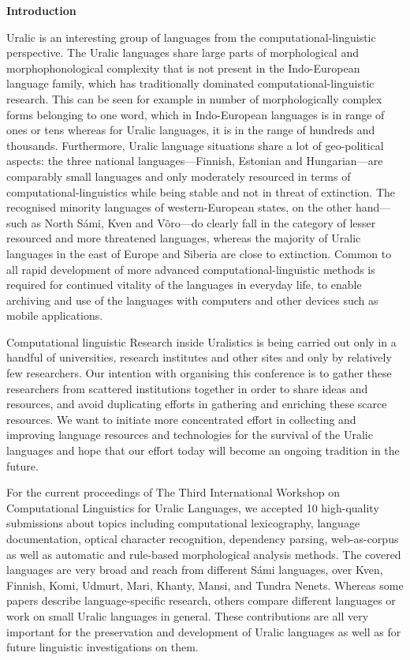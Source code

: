 \documentclass[11pt]{article}
\begin{document}
\begin{center}
  {\Large \bf Introduction}
\end{center}

\vspace*{0.5cm}


Uralic is an interesting group of languages from the
computational-linguistic perspective.  The Uralic languages share large
parts of morphological and morphophonological complexity that is not present in
the Indo-European language family, which has traditionally dominated
computational-linguistic research.  This can be seen for example in number of
morphologically complex forms belonging to one word, which in Indo-European
languages is in range of ones or tens whereas for Uralic languages, it is in the
range of hundreds and thousands.  Furthermore, Uralic language situations share
a lot of geo-political aspects: the three national languages---Finnish, Estonian
and Hungarian---are comparably small languages and only moderately resourced in
terms of computational-linguistics while being stable and not in threat of
extinction. The recognised minority languages of western-European states, on the
other hand---such as North Sámi, Kven and Võro---do clearly fall in the category
of lesser resourced and more threatened languages, whereas the majority of
Uralic languages in the east of Europe and Siberia are close to extinction.
Common to all rapid development of more advanced computational-linguistic
methods is required for continued vitality of the languages in everyday life, to
enable archiving and use of the languages with computers and other devices such
as mobile applications.

Computational linguistic Research inside Uralistics is being carried out only in
a handful of universities, research institutes and other sites and only by
relatively few researchers.  Our intention with organising this conference is to
gather these researchers from scattered institutions together in order to share
ideas and resources, and avoid duplicating efforts in gathering and enriching
these scarce resources. We want to initiate more concentrated effort in
collecting and improving language resources and technologies for the survival of
the Uralic languages and hope that our effort today will become an ongoing
tradition in the future.

For the current proceedings of The Third International Workshop on Computational
Linguistics for Uralic Languages, we accepted 10 high-quality submissions about
topics including computational lexicography, language documentation, optical
character recognition, dependency parsing, web-as-corpus as well as automatic
and rule-based morphological analysis methods. The covered languages are very
broad and reach from different Sámi languages, over Kven, Finnish, Komi, Udmurt,
Mari, Khanty, Mansi, and Tundra Nenets. Whereas some papers describe
language-specific research, others compare different languages or work on small
Uralic languages in general. These contributions are all very important for the
preservation and development of Uralic languages as well as for future
linguistic investigations on them.
\end{document}
